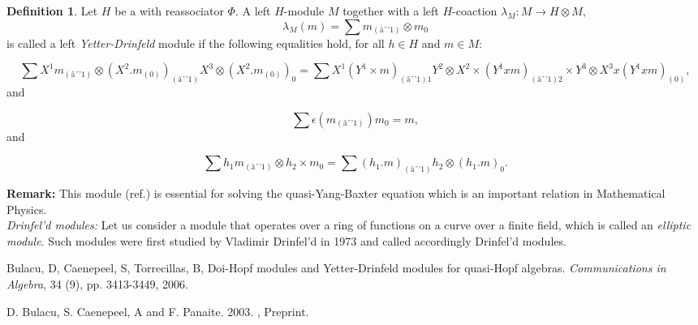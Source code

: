 \documentclass[12pt]{article}
\theoremstyle{plain}
\theoremstyle{definition}
\newtheorem{definition}{Definition}[section]
\numberwithin{equation}{section}
\begin{document}
\begin{definition}
Let $H$ be a  with reassociator $\Phi$. A left $H$-module
$M$ together with a left $H$-coaction $\lambda_M : M \to  H \otimes M,$
$$\lambda_M (m) = \sum m_{(âˆ’1)} \otimes m_0$$
is called a left \emph{Yetter-Drinfeld} module if the following equalities hold, for all 
$h \in H$ and $m \in M :$

$$\sum X^1 m_{(âˆ’1)} \otimes (X^2 . m_{(0)})_{(âˆ’1)} X^3 \otimes  (X^2 . m_{(0)})_0
=  \sum X^1(Y^1 \times m)_{(âˆ’1)1} Y^2 \otimes X^2 \times (Y^1 x m)_{(âˆ’1)2} \times Y^3 \otimes X^3 x (Y^1 x m)_{(0)},$$ 
and

$$ \sum \epsilon(m_{(âˆ’1)})m_0 = m ,$$ and

$$ \sum h_1 m_{(âˆ’1)} \otimes h_2 \times m_0 =  \sum (h_1 . m)_{(âˆ’1)} h_2 \otimes (h_1 . m)_0.$$  
\end{definition}

{\bf Remark:}
This module (ref.\cite{BCT2k6}) is essential for solving the quasi-Yang-Baxter equation which is
an important relation in Mathematical Physics.\\
{\em Drinfel'd modules:} 
Let us consider a module that operates over a ring of functions on a curve over a finite field, which is called an {\em elliptic module}. Such modules were first studied by Vladimir Drinfel'd in 1973 and called accordingly 
Drinfel'd modules. 


\begin{thebibliography}{9}
Bulacu, D, Caenepeel, S, Torrecillas, B, Doi-Hopf modules and Yetter-Drinfeld modules for quasi-Hopf algebras. \emph{Communications in Algebra}, 34 (9), pp. 3413-3449, 2006. 

D. Bulacu, S. Caenepeel, A and F. Panaite. 2003. 
, Preprint. 

\end{thebibliography}

\end{document}
